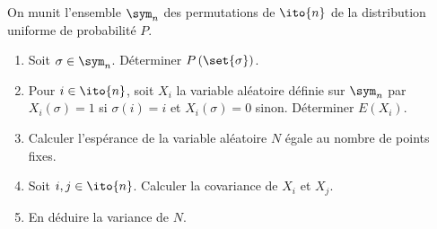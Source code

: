 \begin{enonce}
\begin{exercise}[ID={RMS133 E758},subtitle={Mines-Ponts PSI 2022},tags={mpsi},difficulty={}]
  On munit l'ensemble $\sym_n$ des permutations de $\ito{n}$ de la distribution uniforme de probabilité $P$.
  \begin{enumerate}
    \item Soit $\sigma\in\sym_n$. Déterminer $P\left( \set{\sigma} \right)$.

    \item Pour $i\in\ito{n}$, soit $X_i$ la variable aléatoire définie sur $\sym_n$ par $X_i(\sigma)=1$ si $\sigma(i)=i$ et $X_i(\sigma)=0$ sinon.
      Déterminer $E(X_i)$.

    \item Calculer l'espérance de la variable aléatoire $N$ égale au nombre de points fixes.

    \item Soit $i,j\in\ito{n}$.
      Calculer la covariance de $X_i$ et $X_j$.

    \item En déduire la variance de $N$.
  \end{enumerate}
\end{exercise}
\begin{solution}
\end{solution}
\end{enonce}
